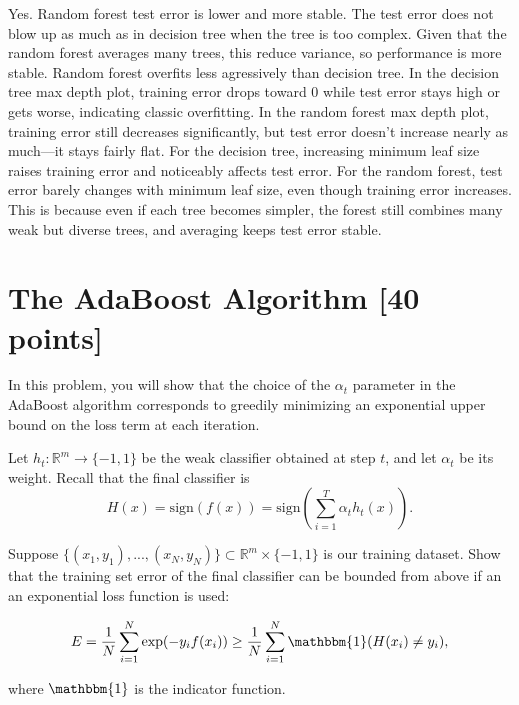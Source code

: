 \documentclass{article}
\begin{document}
\begin{solution}
Yes. Random forest test error is lower and more stable. The test error does not blow up as much as in decision tree when the tree is too complex.
Given that the random forest averages many trees, this reduce variance, so performance is more stable. 
Random forest overfits less agressively than decision tree. 
In the decision tree max depth plot, training error drops toward 0 while test error stays high or gets worse, indicating classic overfitting. In the random forest max depth plot, training error still decreases significantly, but test error doesn't increase nearly as much---it stays fairly flat.
For the decision tree, increasing minimum 
leaf size raises training error and noticeably 
affects test error. For the random forest, test error
 barely changes with minimum leaf size, even though training error increases. 
 This is because even if each tree becomes simpler, the forest still
combines many weak but diverse trees, and averaging keeps test error stable.

\end{solution}



\newpage
\section{The AdaBoost Algorithm [40 points]}

In this problem, you will show that the choice of the $\alpha_t$ parameter in
the AdaBoost algorithm corresponds to greedily minimizing an exponential upper
bound on the loss term at each iteration.

\problem[3]
Let $h_t: \mathbb{R}^m \rightarrow \{-1,1\}$ be the weak classifier obtained at step $t$, and let $\alpha_t$ be
its weight. Recall that the final classifier is $$H(x) = \text{sign}(f(x)) = \text{sign} \left(\sum\limits_{i=1}^T \alpha_{t}h_t(x) \right).$$

Suppose $\{(x_1, y_1), ..., (x_N, y_N)\} \subset \mathbb{R}^m \times \{-1,1\}$ is our training dataset.  Show that the training set error of the final classifier can be bounded from
above if an an exponential loss function is used:

$$E = \frac{1}{N} \sum\limits_{i=1}^N \exp(-y_{i}f(x_i)) \geq \frac{1}{N} \sum\limits_{i=1}^N \mathbbm{1}(H(x_i) \neq y_i),$$

where $\mathbbm{1}$ is the indicator function.

\begin{solution}

\end{solution}
\end{document}
